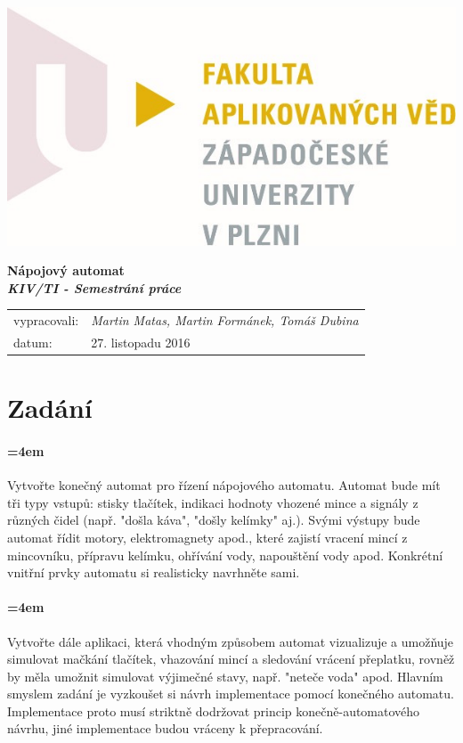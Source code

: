 \documentclass[12pt,a4paper]{article}
\begin{document}
%
%
\begin{titlepage}
	\includegraphics[left]{images/logo_fav}\par
	\vspace{5cm}
	{
		\centering
		\Huge{\textbf{Nápojový automat}}\\
		\Huge{\textbf{\textit{KIV/TI - Semestrání práce}}}\\
	}	
	\vfill
    \begin{tabular}{ll}
		vypracovali: & \it{Martin Matas, Martin Formánek, Tomáš Dubina} \\
		datum: & {\large 27. listopadu 2016\par}
	\end{tabular}
\end{titlepage}
%
%
\tableofcontents
\newpage
%
%
\section{Zadání}

\paragraph{\parindent=4em}{
	Vytvořte konečný automat pro řízení nápojového automatu. Automat bude mít tři typy vstupů: stisky tlačítek, indikaci hodnoty vhozené mince a signály z různých čidel (např. "došla káva", "došly kelímky" aj.). Svými výstupy bude automat řídit motory, elektromagnety apod., které zajistí vracení mincí z mincovníku, přípravu kelímku, ohřívání vody, napouštění vody apod. Konkrétní vnitřní prvky automatu si realisticky navrhněte sami.
}

\paragraph{\parindent=4em}{	
	Vytvořte dále aplikaci, která vhodným způsobem automat vizualizuje a umožňuje simulovat mačkání tlačítek, vhazování mincí a sledování vrácení přeplatku, rovněž by měla umožnit simulovat výjimečné stavy, např. "neteče voda" apod.
Hlavním smyslem zadání je vyzkoušet si návrh implementace pomocí konečného automatu. Implementace proto musí striktně dodržovat princip konečně-automatového návrhu, jiné implementace budou vráceny k přepracování.
}
\end{document}
